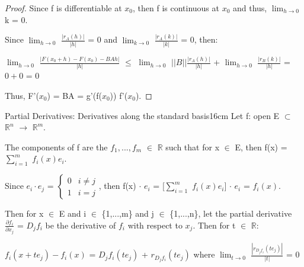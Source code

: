 \begin{proof}
        Since f is differentiable at $x_0$, then f is continuous at $x_0$
        and thus, $\lim_{h \rightarrow 0}$ k = 0.

        Since $\lim_{h \rightarrow 0}$ $\frac{|r_A(h)|}{|h|}$ = 0
        and $\lim_{k \rightarrow 0}$ $\frac{|r_A(k)|}{|k|}$ = 0, then:

        \hspace{0.5cm}
        $\lim_{h \rightarrow 0}$ $\frac{|F(x_0+h) - F(x_0) - BAh|}{|h|}$
        $\leq$ $\lim_{h \rightarrow 0}$ $||B|| \frac{|r_A(h)|}{|h|}$
                + $\lim_{h \rightarrow 0}$ $\frac{|r_B(k)|}{|h|}$
        = $0+0$ = 0

        Thus, F'($x_0$) = BA = g'(f($x_0$)) f'($x_0$).
    \end{proof}

    \vspace{0.5cm}



    \begin{definition}{Partial Derivatives: Derivatives along
    the standard basis}{16cm}
        Let f: open E $\subset$ $\mathbb{R}^n$ $\rightarrow$ $\mathbb{R}^m$.

        The components of f are the $f_1,...,f_m$ $\in$ $\mathbb{R}$ such that
        for x $\in$ E, then f(x) = $\sum_{i=1}^m$ $f_i(x) e_i$.

        Since $e_i \cdot e_j$ =
        $
        \begin{cases}
            0 & i \not = j \\
            1 & i = j
        \end{cases}$, then
        f(x) $\cdot$ $e_i$
        = $[\sum_{i=1}^m$ $f_i(x) e_i]$ $\cdot$ $e_i$
        = $f_i(x)$.

        \vspace{0.2cm}

        Then for x $\in$ E and i $\in$ \{1,...,m\} and j $\in$ \{1,...,n\},
        let the {\color{lblue} partial derivative}
        $\frac{\partial f_i}{\partial x_j}$ = $D_jf_i$
        be the derivative of $f_i$ with respect to $x_j$.
        Then for t $\in$ $\mathbb{R}$:

        \hspace{0.5cm}
        $f_i(x+te_j) - f_i(x)$ = $D_jf_i(te_j)$ + $r_{D_jf_i}(te_j)$
        \hspace{0.7cm}
        where $\lim_{t \rightarrow 0}$ $\frac{|r_{D_jf_i}(te_j)|}{|t|}$ = 0
    \end{definition}

